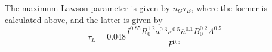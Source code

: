 \documentclass[answers]{exam}
\begin{document}
\begin{questions}
\begin{parts}
\begin{solution}
    The maximum Lawson parameter is given by $n_G\tau_E$, where the former is calculated above, and the latter is given by
    $$\tau_L = 0.048 \frac{I^{0.85}R_0^{1.2}a^{0.3}\kappa^{0.5}\overline{n}^{0.1} B_0^{0.2}A^{0.5}}{P^{0.5}}$$
\end{solution}
\end{parts}

\end{questions}
\end{document}
